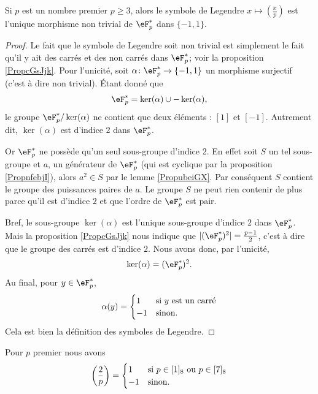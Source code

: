\begin{lemma}\label{Lemoabzrn}
    Si \( p\) est un nombre premier \( p\geq 3\), alors le symbole de Legendre \( x\mapsto\left(\frac{x}{p}\right)\) est l'unique morphisme non trivial de \( \eF^*_p\) dans \( \{ -1,1 \}\).
\end{lemma}

\begin{proof}
    Le fait que le symbole de Legendre soit non trivial est simplement le fait qu'il y ait des carrés et des non carrés dans \( \eF_p^*\); voir la proposition \ref{PropcGsJjk}. Pour l'unicité, soit \( \alpha\colon \eF^*_p\to \{ -1,1 \}\) un morphisme surjectif (c'est à dire non trivial). Étant donné que 
    \begin{equation}
        \eF^*_p=\ker(\alpha)\cup-\ker(\alpha),
    \end{equation}
    le groupe \( \eF_p^*/\ker(\alpha)\) ne contient que deux éléments : \( [1]\) et \( [-1]\). Autrement dit, \( \ker(\alpha)\) est d'indice \( 2\) dans \( \eF_p^*\). 
    
    Or \( \eF_p^*\) ne possède qu'un seul sous-groupe d'indice \( 2\). En effet soit \( S\) un tel sous-groupe et \( a\), un générateur de \( \eF_p^*\) (qui est cyclique par la proposition \ref{PropnfebjI}), alors \( a^2\in S\) par le lemme \ref{PropubeiGX}. Par conséquent \( S\) contient le groupe des puissances paires de \( a\). Le groupe $S$ ne peut rien contenir de plus parce qu'il est d'indice \( 2\) et que l'ordre de \( \eF_p^*\) est pair.

    Bref, le sous-groupe \( \ker(\alpha)\) est l'unique sous-groupe d'indice \( 2\) dans \( \eF_p^*\). Mais la proposition \ref{PropcGsJjk} nous indique que \( | (\eF_p^*)^2 |=\frac{ p-1 }{2}\), c'est à dire que le groupe des carrés est d'indice \( 2\). Nous avons donc, par l'unicité,
    \begin{equation}
        \ker(\alpha)=(\eF_p^*)^2.
    \end{equation}
    Au final, pour \( y\in \eF_p^*\),
    \begin{equation}
        \alpha(y)=\begin{cases}
           1 &   \text{si \( y\) est un carré}\\
            -1    &    \text{sinon.}
        \end{cases}
    \end{equation}
    Cela est bien la définition des symboles de Legendre.
\end{proof}
 
\begin{proposition}
    Pour \( p\) premier nous avons
    \begin{equation}
        \left(\frac{2}{p}\right)=\begin{cases}
            1    &   \text{si \( p\in [1]_8\) ou \( p\in [7]_8\)}\\
            -1    &    \text{sinon}.
        \end{cases}
    \end{equation}
\end{proposition}

